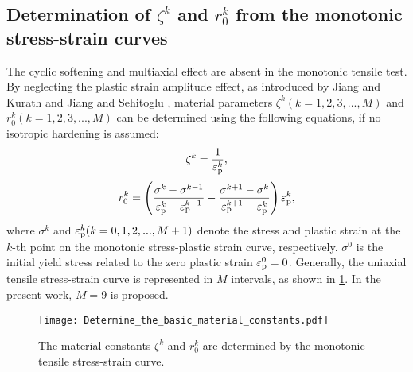 \subsection{Determination of $\zeta^k$ and $r_0^k$ from the monotonic stress-strain curves}
\noindent
The cyclic softening and multiaxial effect are absent in the monotonic tensile test.
By neglecting the plastic strain amplitude effect, as introduced by Jiang and Kurath \cite{Jiang1996387} and Jiang and Sehitoglu \cite{jiang1996modeling}, material parameters ${\zeta ^k}( k = 1,2,3,...,M )$ and $r_0^k( k = 1,2,3,...,M )$ can be determined using the following equations, if no isotropic hardening is assumed:
\begin{equation}
{\zeta ^k} = \frac{1}{{\varepsilon _{\rm{p}}^k}},
\label{Eqn:zetak}
\end{equation}
\begin{equation}
r_0^k = \left( {\frac{{\sigma _{}^k - \sigma _{}^{k - 1}}}{{\varepsilon _{\rm{p}}^k - \varepsilon _{\rm{p}}^{k - 1}}} - \frac{{\sigma _{}^{k + 1} - \sigma _{}^k}}{{\varepsilon _{\rm{p}}^{k + 1} - \varepsilon _{\rm{p}}^k}}} \right)\varepsilon _{\rm{p}}^k,
\end{equation}
where $\sigma^k$ and $\varepsilon_{\rm p}^k( k = 0,1,2,...,M+1 )$ denote the stress and plastic strain at the $k$-th point on the monotonic stress-plastic strain curve, respectively. $\sigma^0$ is the initial yield stress related to the zero plastic strain $\varepsilon_{\rm p}^0=0$. Generally, the uniaxial tensile stress-strain curve is represented in $M$ intervals, as shown in \ref{Fig:Determine_the_basic_material_constants}. In the present work, $M=9$ is proposed.

\begin{figure}[!htp]
  \centering
  \texttt{[image: Determine\_the\_basic\_material\_constants.pdf]}
  \caption{The material constants $\zeta^k$ and $r_0^k$ are determined by the monotonic tensile stress-strain curve.}
  \label{Fig:Determine_the_basic_material_constants}
\end{figure}

